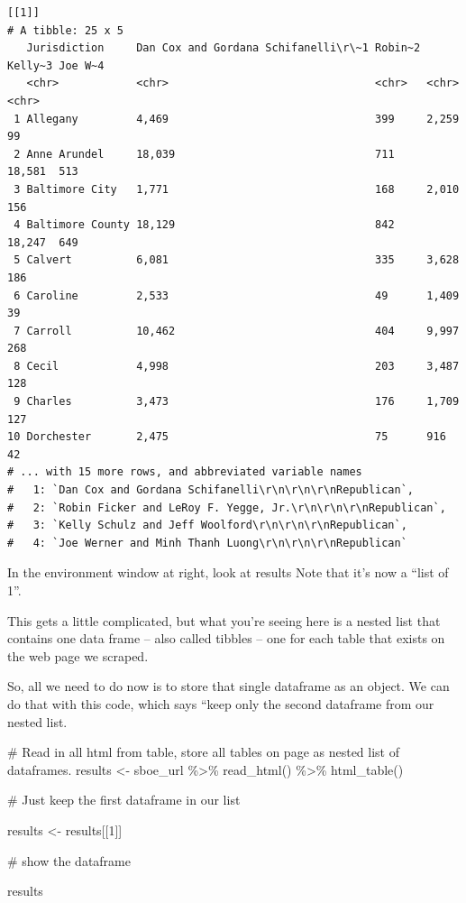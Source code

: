 \documentclass[
  letterpaper,
  DIV=11,
  numbers=noendperiod]{scrreprt}
\newenvironment{Shaded}{\begin{snugshade}}{\end{snugshade}}
\newcommand{\CommentTok}[1]{\textcolor[rgb]{0.37,0.37,0.37}{#1}}
\newcommand{\DecValTok}[1]{\textcolor[rgb]{0.68,0.00,0.00}{#1}}
\newcommand{\FunctionTok}[1]{\textcolor[rgb]{0.28,0.35,0.67}{#1}}
\newcommand{\NormalTok}[1]{\textcolor[rgb]{0.00,0.23,0.31}{#1}}
\newcommand{\OtherTok}[1]{\textcolor[rgb]{0.00,0.23,0.31}{#1}}
\newcommand{\SpecialCharTok}[1]{\textcolor[rgb]{0.37,0.37,0.37}{#1}}
\begin{document}
\begin{verbatim}
[[1]]
# A tibble: 25 x 5
   Jurisdiction     Dan Cox and Gordana Schifanelli\r\~1 Robin~2 Kelly~3 Joe W~4
   <chr>            <chr>                                <chr>   <chr>   <chr>  
 1 Allegany         4,469                                399     2,259   99     
 2 Anne Arundel     18,039                               711     18,581  513    
 3 Baltimore City   1,771                                168     2,010   156    
 4 Baltimore County 18,129                               842     18,247  649    
 5 Calvert          6,081                                335     3,628   186    
 6 Caroline         2,533                                49      1,409   39     
 7 Carroll          10,462                               404     9,997   268    
 8 Cecil            4,998                                203     3,487   128    
 9 Charles          3,473                                176     1,709   127    
10 Dorchester       2,475                                75      916     42     
# ... with 15 more rows, and abbreviated variable names
#   1: `Dan Cox and Gordana Schifanelli\r\n\r\n\r\nRepublican`,
#   2: `Robin Ficker and LeRoy F. Yegge, Jr.\r\n\r\n\r\nRepublican`,
#   3: `Kelly Schulz and Jeff Woolford\r\n\r\n\r\nRepublican`,
#   4: `Joe Werner and Minh Thanh Luong\r\n\r\n\r\nRepublican`
\end{verbatim}

In the environment window at right, look at results Note that it's now a
``list of 1''.

This gets a little complicated, but what you're seeing here is a nested
list that contains one data frame -- also called tibbles -- one for each
table that exists on the web page we scraped.

So, all we need to do now is to store that single dataframe as an
object. We can do that with this code, which says ``keep only the second
dataframe from our nested list.

\begin{Shaded}
\begin{Highlighting}[]
\CommentTok{\# Read in all html from table, store all tables on page as nested list of dataframes.}
\NormalTok{results }\OtherTok{\textless{}{-}}\NormalTok{ sboe\_url }\SpecialCharTok{\%\textgreater{}\%}
  \FunctionTok{read\_html}\NormalTok{() }\SpecialCharTok{\%\textgreater{}\%}
  \FunctionTok{html\_table}\NormalTok{()}

\CommentTok{\# Just keep the first dataframe in our list}

\NormalTok{results }\OtherTok{\textless{}{-}}\NormalTok{ results[[}\DecValTok{1}\NormalTok{]]}

\CommentTok{\# show the dataframe}

\NormalTok{results}
\end{Highlighting}
\end{Shaded}
\end{document}
